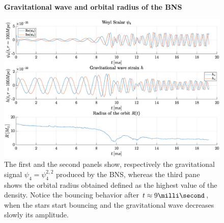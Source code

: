 \begin{figure}[H]
\centering
    \textbf{Gravitational wave and orbital radius of the BNS}\par\medskip
\centering   
\includegraphics[width=1\textwidth]{numerical_evolution/gw_r_bns.eps}
\caption{The first and the second panels show, respectively the gravitational signal $\psi_4=\psi_4 ^{2,2}$ produced by the BNS, whereas the third pane shows the orbital radius obtained defined as the highest value of the density. 
Notice the bouncing behavior after $t \approx 9 \milli \second$, when the stars start bouncing and the gravitational wave decreases slowly its amplitude.}
\label{gw_r_bns}
\end{figure}

